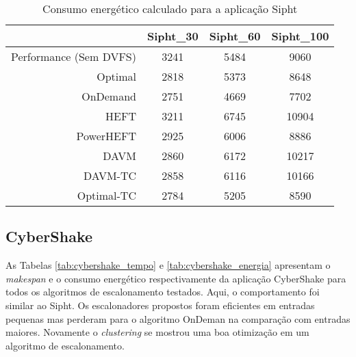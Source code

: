 \begin{table}
	\centering
    \begin{tabular}{r|ccc}
    ~                    & Sipht\_30 & Sipht\_60 & Sipht\_100 \\ \hline
    Performance (Sem DVFS) & 3241     & 5484     & 9060      \\
    \cite{guerout:energy_aware_simulation} Optimal      & 2818     & 5373     & 8648      \\
    \cite{guerout:energy_aware_simulation} OnDemand     & 2751     & 4669     & 7702      \\
    HEFT                   & 3211     & 6745     & 10904     \\
    PowerHEFT              & 2925     & 6006     & 8886      \\
    DAVM                   & 2860     & 6172     & 10217     \\
    DAVM-TC                & 2858     & 6116     & 10166     \\
    Optimal-TC             & 2784     & 5205     & 8590      \\
    \end{tabular}
    \caption{Consumo energético calculado para a aplicação Sipht}
    \label{tab:sipht_energia}
\end{table}


\subsection{CyberShake} %
\label{sub:cybershake}

As Tabelas \ref{tab:cybershake_tempo} e \ref{tab:cybershake_energia} apresentam o
\emph{makespan} e o consumo energético respectivamente da aplicação CyberShake para
todos os algoritmos de escalonamento testados. Aqui, o comportamento foi similar
ao Sipht. Os escalonadores propostos foram eficientes em entradas pequenas mas
perderam para o algoritmo OnDeman na comparação com entradas maiores. Novamente
o \emph{clustering} se mostrou uma boa otimização em um algoritmo de
escalonamento.



